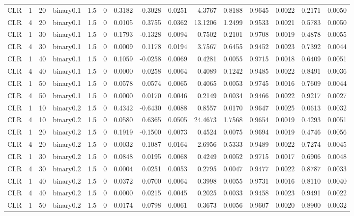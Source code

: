 \begin{longtable}{rrrrrrrrrrrrrrr}
  CLR & 1 & 20 & binary0.1 & 1.5 & 0 & 0.3182 & -0.3028 & 0.0251 & 4.3767 & 0.8188 & 0.9645 & 0.0022 & 0.2171 & 0.0050 \\ 
  CLR & 4 & 20 & binary0.1 & 1.5 & 0 & 0.0105 & 0.3755 & 0.0362 & 13.1206 & 1.2499 & 0.9533 & 0.0021 & 0.5783 & 0.0050 \\ 
  CLR & 1 & 30 & binary0.1 & 1.5 & 0 & 0.1793 & -0.1328 & 0.0094 & 0.7502 & 0.2101 & 0.9708 & 0.0019 & 0.4878 & 0.0055 \\ 
  CLR & 4 & 30 & binary0.1 & 1.5 & 0 & 0.0009 & 0.1178 & 0.0194 & 3.7567 & 0.6455 & 0.9452 & 0.0023 & 0.7392 & 0.0044 \\ 
  CLR & 1 & 40 & binary0.1 & 1.5 & 0 & 0.1059 & -0.0258 & 0.0069 & 0.4281 & 0.0055 & 0.9715 & 0.0018 & 0.6409 & 0.0051 \\ 
  CLR & 4 & 40 & binary0.1 & 1.5 & 0 & 0.0000 & 0.0258 & 0.0064 & 0.4089 & 0.1242 & 0.9485 & 0.0022 & 0.8491 & 0.0036 \\ 
  CLR & 1 & 50 & binary0.1 & 1.5 & 0 & 0.0578 & 0.0574 & 0.0065 & 0.4065 & 0.0053 & 0.9745 & 0.0016 & 0.7609 & 0.0044 \\ 
  CLR & 4 & 50 & binary0.1 & 1.5 & 0 & 0.0000 & 0.0170 & 0.0046 & 0.2149 & 0.0034 & 0.9466 & 0.0022 & 0.9217 & 0.0027 \\ 
  CLR & 1 & 10 & binary0.2 & 1.5 & 0 & 0.4342 & -0.6430 & 0.0088 & 0.8557 & 0.0170 & 0.9647 & 0.0025 & 0.0613 & 0.0032 \\ 
  CLR & 4 & 10 & binary0.2 & 1.5 & 0 & 0.0580 & 0.6365 & 0.0505 & 24.4673 & 1.7568 & 0.9654 & 0.0019 & 0.4293 & 0.0051 \\ 
  CLR & 1 & 20 & binary0.2 & 1.5 & 0 & 0.1919 & -0.1500 & 0.0073 & 0.4524 & 0.0075 & 0.9694 & 0.0019 & 0.4746 & 0.0056 \\ 
  CLR & 4 & 20 & binary0.2 & 1.5 & 0 & 0.0032 & 0.1087 & 0.0164 & 2.6956 & 0.5333 & 0.9489 & 0.0022 & 0.7274 & 0.0045 \\ 
  CLR & 1 & 30 & binary0.2 & 1.5 & 0 & 0.0848 & 0.0195 & 0.0068 & 0.4249 & 0.0052 & 0.9715 & 0.0017 & 0.6906 & 0.0048 \\ 
  CLR & 4 & 30 & binary0.2 & 1.5 & 0 & 0.0004 & 0.0251 & 0.0053 & 0.2795 & 0.0047 & 0.9477 & 0.0022 & 0.8787 & 0.0033 \\ 
  CLR & 1 & 40 & binary0.2 & 1.5 & 0 & 0.0372 & 0.0700 & 0.0064 & 0.3998 & 0.0055 & 0.9731 & 0.0016 & 0.8110 & 0.0040 \\ 
  CLR & 4 & 40 & binary0.2 & 1.5 & 0 & 0.0000 & 0.0215 & 0.0045 & 0.2025 & 0.0033 & 0.9458 & 0.0023 & 0.9491 & 0.0022 \\ 
  CLR & 1 & 50 & binary0.2 & 1.5 & 0 & 0.0174 & 0.0798 & 0.0061 & 0.3673 & 0.0056 & 0.9607 & 0.0020 & 0.8900 & 0.0032 \\ 

\end{longtable}
